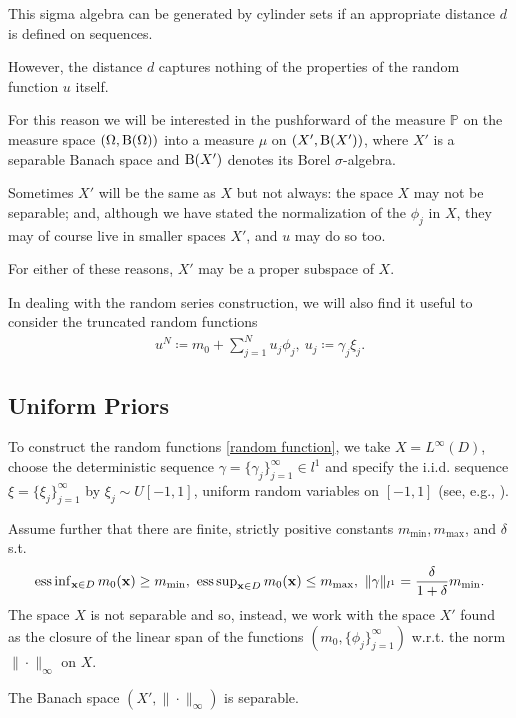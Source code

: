 \documentclass[oneside,11pt]{book}
\numberwithin{equation}{section}
\begin{document}
This sigma algebra can be generated by cylinder sets if an appropriate distance $d$ is defined on sequences.

However, the distance $d$ captures nothing of the properties of the random function $u$ itself.

For this reason we will be interested in the pushforward of the measure $\mathbb{P}$ on the measure space $(\Omega,{\rm B}(\Omega))$ into a measure $\mu$ on $(X',{\rm B}(X'))$, where $X'$ is a separable Banach space and ${\rm B}(X')$ denotes its Borel $\sigma$-algebra.

Sometimes $X'$ will be the same as $X$ but not always: the space $X$ may not be separable; and, although we have stated the normalization of the $\phi_j$ in $X$, they may of course live in smaller spaces $X'$, and $u$ may do so too.

For either of these reasons, $X'$ may be a proper subspace of $X$.

%
In dealing with the random series construction, we will also find it useful to consider the truncated random functions
\begin{align*}
    u^N\coloneqq m_0 + \sum_{j=1}^N u_j\phi_j,\ u_j\coloneqq\gamma_j\xi_j.
\end{align*}

\subsection{Uniform Priors}
To construct the random functions \eqref{random function}, we take $X = L^\infty(D)$, choose the deterministic sequence $\gamma = \{\gamma_j\}_{j=1}^\infty\in l^1$ and specify the i.i.d. sequence $\xi = \{\xi_j\}_{j=1}^\infty$ by $\xi_j\sim U[-1,1]$, uniform random variables on $[-1,1]$ (see, e.g., \cite[Sect. 3.3]{Pope2000}).

Assume further that there are finite, strictly positive constants $m_{\min},m_{\max}$, and $\delta$ s.t.
\begin{align*}
    \operatorname{ess\inf}_{{\bf x}\in D} m_0({\bf x})\ge m_{\min},\ \operatorname{ess\sup}_{{\bf x}\in D} m_0({\bf x})\le m_{\max},\ \|\gamma\|_{l^1} = \frac{\delta}{1 + \delta}m_{\min}.
\end{align*}
The space $X$ is not separable and so, instead, we work with the space $X'$ found as the closure of the linear span of the functions $(m_0,\{\phi_j\}_{j=1}^\infty)$ w.r.t. the norm $\|\cdot\|_\infty$ on $X$.

The Banach space $(X',\|\cdot\|_\infty)$ is separable.
\end{document}
